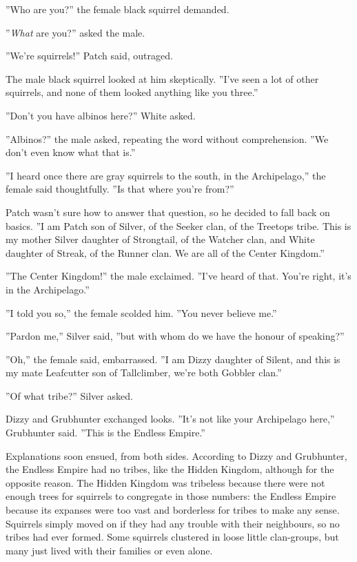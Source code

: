 \documentclass[11pt]{article}
\begin{document}
 ''Who are you?'' the female black squirrel demanded.\par
 ''{\it What} are you?'' asked the male.\par
 ''We're squirrels!'' Patch said, outraged.\par
 The male black squirrel looked at him skeptically. ''I've seen a lot of other squirrels, and none of them looked anything like you three.''\par
 ''Don't you have albinos here?'' White asked.\par
 ''Albinos?'' the male asked, repeating the word without comprehension. ''We don't even know what that is.''\par
 ''I heard once there are gray squirrels to the south, in the Archipelago,'' the female said thoughtfully. ''Is that where you're from?''\par
 Patch wasn't sure how to answer that question, so he decided to fall back on basics. ''I am Patch son of Silver, of the Seeker clan, of the Treetops tribe. This is my mother Silver daughter of Strongtail, of the Watcher clan, and White daughter of Streak, of the Runner clan. We are all of the Center Kingdom.''\par
 ''The Center Kingdom!'' the male exclaimed. ''I've heard of that. You're right, it's in the Archipelago.''\par
 ''I told you so,'' the female scolded him. ''You never believe me.''\par
 ''Pardon me,'' Silver said, ''but with whom do we have the honour of speaking?''\par
 ''Oh,'' the female said, embarrassed. ''I am Dizzy daughter of Silent, and this is my mate Leafcutter son of Tallclimber, we're both Gobbler clan.''\par
 ''Of what tribe?'' Silver asked.\par
 Dizzy and Grubhunter exchanged looks. ''It's not like your Archipelago here,'' Grubhunter said. ''This is the Endless Empire.''\par
 Explanations soon ensued, from both sides. According to Dizzy and Grubhunter, the Endless Empire had no tribes, like the Hidden Kingdom, although for the opposite reason. The Hidden Kingdom was tribeless because there were not enough trees for squirrels to congregate in those numbers: the Endless Empire because its expanses were too vast and borderless for tribes to make any sense. Squirrels simply moved on if they had any trouble with their neighbours, so no tribes had ever formed. Some squirrels clustered in loose little clan-groups, but many just lived with their families or even alone.\par
\end{document}

